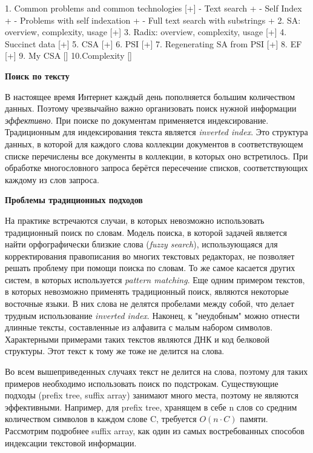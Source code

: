 1. Common problems and common technologies [+]
 - Text search +
 - Self Index +
 - Problems with self indexation +
 - Full text search with substrings +
2. SA: overview, complexity, usage         [+]
3. Radix: overview, complexity, usage      [+]
4. Succinct data                           [+]
5. CSA                                     [+]
6. PSI                                     [+]
7. Regenerating SA from PSI                [+]
8. EF                                      [+]
9. My CSA                                  []
10.Complexity                              []

\textbf{Поиск по тексту}

В настоящее время Интернет каждый день пополняется большим количеством данных.
Поэтому чрезвычайно важно организовать поиск нужной информации \emph{эффективно}.
При поиске по документам применяется индексирование.
Традиционным для индексирования текста является \emph{inverted index}.
Это структура данных, в которой для каждого слова коллекции документов в соответствующем списке
перечислены все документы в коллекции, в которых оно встретилось.
При обработке многословного запроса берётся пересечение списков, соответствующих каждому из слов запроса.

\textbf{Проблемы традиционных подходов}

На практике встречаются случаи, в которых невозможно использовать традиционный поиск по словам.
Модель поиска, в которой задачей является найти орфографически близкие слова (\emph{fuzzy search}),
использующаяся для корректирования правописания во многих текстовых редакторах,
не позволяет решать проблему при помощи поиска по словам.
То же самое касается других систем, в которых используется \emph{pattern matching}.
Еще одним примером текстов, в которых невозможно применять традиционный поиск,
являются некоторые восточные языки.
В них слова не делятся пробелами между собой, что делает трудным использование \emph{inverted index}.
Наконец, к "неудобным" можно отнести длинные тексты, составленные из алфавита с малым набором символов.
Характерными примерами таких текстов являются ДНК и код белковой структуры.
Этот текст к тому же тоже не делится на слова.

Во всем вышеприведенных случаях текст не делится на слова,
поэтому для таких примеров необходимо использовать поиск по подстрокам.
Существующие подходы (prefix tree, suffix array) занимают много места, поэтому не являются эффективными.
Например, для prefix tree, хранящем в себе n слов со средним количеством символов в каждом слове C,
требуется $O(n \cdot C)$ памяти.
Рассмотрим подробнее suffix array, как один из самых востребованных способов индексации текстовой информации.

